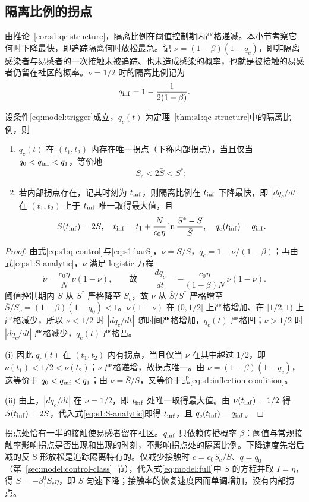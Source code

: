 \subsection{隔离比例的拐点}
\label{sec:s1:shape}
由推论~\ref{cor:s1:qc-structure}，隔离比例在阈值控制期内严格递减。本小节考察它何时下降最快，即追踪隔离何时放松最急。记 $\nu=(1-\beta)(1-q_c)$，即非隔离感染者与易感者的一次接触未被追踪、也未造成感染的概率，也就是被接触的易感者仍留在社区的概率。$\nu=1/2$ 时的隔离比例记为
\[
q_{\mathrm{inf}}=1-\frac{1}{2(1-\beta)}.
\]
\begin{theorem}
\label{thm:s1:inflection}
设条件\eqref{eq:model:trigger}成立，$q_c(t)$ 为定理~\ref{thm:s1:qc-structure}中的隔离比例，则
\begin{enumerate}
\renewcommand{\labelenumi}{(\roman{enumi})}
\item $q_c(t)$ 在 $(t_1,t_2)$ 内存在唯一拐点（下称内部拐点），当且仅当 $q_0<q_{\mathrm{inf}}<q_1$，等价地
\begin{equation}
S_c<2\bar S<S^*;
\label{eq:s1:inflection-condition}
\end{equation}
\item 若内部拐点存在，记其时刻为 $t_{\rm inf}$，则隔离比例在 $t_{\rm inf}$ 下降最快，即 $|dq_c/dt|$ 在 $(t_1,t_2)$ 上于 $t_{\rm inf}$ 唯一取得最大值，且
\begin{equation}
S(t_{\rm inf})=2\bar S,\quad
 t_{\rm inf}=t_1+\frac{N}{c_0\eta}\ln\frac{S^*-\bar S}{\bar S},\quad
q_c(t_{\rm inf})=q_{\mathrm{inf}}.
\label{eq:s1:inflection-values}
\end{equation}
\end{enumerate}
\end{theorem}
\begin{proof}
由式\eqref{eq:s1:q-control}与\eqref{eq:s1:barS}，$\nu=\bar S/S$，$q_c=1-\nu/(1-\beta)$；再由式\eqref{eq:s1:S-analytic}，$\nu$ 满足 logistic 方程
\[
\dot\nu=\frac{c_0\eta}{N}\,\nu(1-\nu),\qquad\text{故}\qquad
\frac{dq_c}{dt}=-\frac{c_0\eta}{(1-\beta)N}\,\nu(1-\nu).
\]
阈值控制期内 $S$ 从 $S^*$ 严格降至 $S_c$，故 $\nu$ 从 $\bar S/S^*$ 严格增至 $\bar S/S_c=(1-\beta)(1-q_0)<1$。$\nu(1-\nu)$ 在 $(0,1/2]$ 上严格增加、在 $[1/2,1)$ 上严格减少，所以 $\nu<1/2$ 时 $|dq_c/dt|$ 随时间严格增加，$q_c(t)$ 严格凹；$\nu>1/2$ 时 $|dq_c/dt|$ 严格减少，$q_c(t)$ 严格凸。

(i) 因此 $q_c(t)$ 在 $(t_1,t_2)$ 内有拐点，当且仅当 $\nu$ 在其中越过 $1/2$，即 $\nu(t_1)<1/2<\nu(t_2)$；$\nu$ 严格递增，故拐点唯一。由 $\nu=(1-\beta)(1-q_c)$，这等价于 $q_0<q_{\mathrm{inf}}<q_1$；由 $\nu=\bar S/S$，又等价于式\eqref{eq:s1:inflection-condition}。

(ii) 由上，$|dq_c/dt|$ 在 $\nu=1/2$，即 $t_{\rm inf}$ 处唯一取得最大值。由 $\nu(t_{\rm inf})=1/2$ 得 $S(t_{\rm inf})=2\bar S$，代入式\eqref{eq:s1:S-analytic}即得 $t_{\rm inf}$，且 $q_c(t_{\rm inf})=q_{\mathrm{inf}}$。
\end{proof}
拐点处恰有一半的接触使易感者留在社区。$q_{\mathrm{inf}}$ 只依赖传播概率 $\beta$：阈值与常规接触率影响拐点是否出现和出现的时刻，不影响拐点处的隔离比例。下降速度先增后减的反 S 形放松是追踪隔离特有的。仅减少接触时 $c=c_0S_c/S$、$q=q_0$（第~\ref{sec:model:control-class}~节），代入式\eqref{eq:model:full}中 $S$ 的方程并取 $I=\eta$，得 $\dot S=-\beta_1^0S_c\eta$，即 $S$ 匀速下降；接触率的恢复速度因而单调增加，没有内部拐点。

